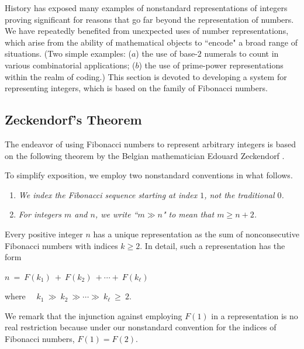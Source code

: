History has exposed many examples of nonstandard representations of integers proving significant for reasons that go far beyond the representation of numbers.  We have repeatedly benefited from unexpected uses of number representations, which arise from the ability of mathematical objects to ``encode" a broad range of situations.  (Two simple examples: ($a$) the use of base-$2$ numerals to count in various combinatorial applications; ($b$) the use of prime-power representations within the realm of coding.)  This section is devoted to developing a system for representing integers, which is based on the family of Fibonacci numbers.

\subsection{Zeckendorf's Theorem}
\label{sec:Zeckendorf's-Theorem}


The endeavor of using Fibonacci numbers to represent arbitrary integers is based on the following theorem by the Belgian mathematician Edouard Zeckendorf \cite{Zeckendorf72}.

\smallskip

To simplify exposition, we employ two nonstandard conventions in what follows.
\begin{enumerate}
\item
{\em We index the Fibonacci sequence starting at index $1$, not the traditional $0$.}
\item
{\em For integers $m$ and $n$, we write ``$m \gg n$" to mean that $m \geq n+2$.}
\end{enumerate}

\begin{prop}
\label{thm:Zeckendorf}
Every positive integer $n$ has a unique representation as the sum of nonconsecutive Fibonacci numbers with indices $k \geq 2$.  In detail, such a representation has the form

\smallskip

\hspace*{.25in} $n \ = \ F(k_1) \ + \ F(k_2) \ + \cdots + \ F(k_\ell)$

\smallskip

\noindent
where \ \ $k_1 \ \gg \ k_2 \ \gg \cdots \gg \ k_\ell \ \geq \ 2$.
\end{prop}

\medskip

We remark that the injunction against employing $F(1)$ in a representation is no real restriction because under our nonstandard convention for the indices of Fibonacci numbers, $F(1)=F(2)$.

